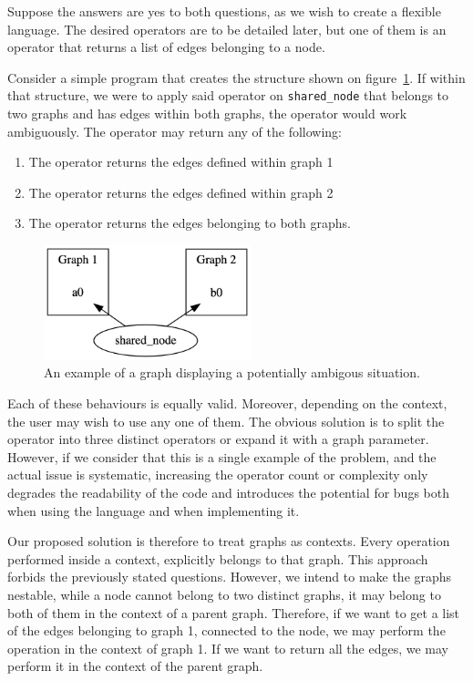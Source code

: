 Suppose the answers are yes to both questions, as we wish to create a flexible language.
The desired operators are to be detailed later, but one of them is an operator that returns a list of edges belonging to a node.

Consider a simple program that creates the structure shown on figure~\ref{fig:syntax_ambigous}.
If within that structure, we were to apply said operator on \lstinline{shared_node} that belongs to two graphs and has edges within both graphs,
the operator would work ambiguously.
The operator may return any of the following:

\begin{enumerate}
    \item The operator returns the edges defined within graph 1
    \item The operator returns the edges defined within graph 2
    \item The operator returns the edges belonging to both graphs.
\end{enumerate}

\begin{figure}[H]
    \centering
    \includegraphics[width=6cm]{figures/syntax_section/syntax_ambigous}
    \caption{An example of a graph displaying a potentially ambigous situation.}
    \label{fig:syntax_ambigous}
\end{figure}



Each of these behaviours is equally valid.
Moreover, depending on the context, the user may wish to use any one of them.
The obvious solution is to split the operator into three distinct operators or expand it with a graph parameter.
However, if we consider that this is a single example of the problem, and the actual issue is systematic,
increasing the operator count or complexity only degrades the readability of the code and introduces the potential for bugs
both when using the language and when implementing it.

Our proposed solution is therefore to treat graphs as contexts.
Every operation performed inside a context, explicitly belongs to that graph.
This approach forbids the previously stated questions.
However, we intend to make the graphs nestable, while a node cannot belong to two distinct graphs,
it may belong to both of them in the context of a parent graph.
Therefore, if we want to get a list of the edges belonging to graph 1, connected to the node, we may perform the
operation in the context of graph 1.
If we want to return all the edges, we may perform it in the context of the parent graph.

